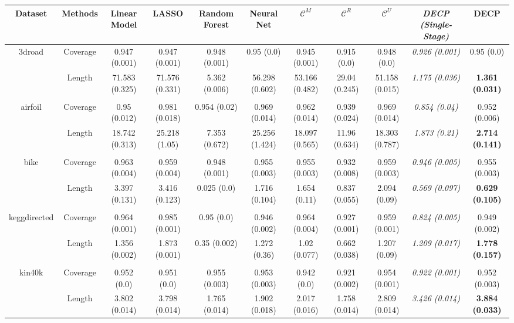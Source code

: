 \begin{tabular}{ccccccccccc}
\toprule
Dataset & Methods & Linear Model & LASSO & Random Forest & Neural Net & $\mathcal{C}^{M}$ & $\mathcal{C}^{R}$ & $\mathcal{C}^{U}$ & \textit{DECP (Single-Stage)} & DECP \\\midrule
3droad & Coverage & 0.947 (0.001)  &  0.947 (0.001)  &  0.948 (0.001)  &  0.95 (0.0)  &  0.945 (0.001)  &  0.915 (0.0)  &  0.948 (0.0)  & \textit{ 0.926 (0.001) } &  0.95 (0.0) \\ 
& Length & 71.583 (0.325)  &  71.576 (0.331)  &  5.362 (0.006)  &  56.298 (0.602)  &  53.166 (0.482)  &  29.04 (0.245)  &  51.158 (0.015)  & \textit{ 1.175 (0.036) } &  \textbf{1.361 (0.031)} \\ 
\hline \\
\hline
airfoil & Coverage & 0.95 (0.012)  &  0.981 (0.018)  &  0.954 (0.02)  &  0.969 (0.014)  &  0.962 (0.014)  &  0.939 (0.024)  &  0.969 (0.014)  & \textit{ 0.854 (0.04) } &  0.952 (0.006) \\ 
& Length & 18.742 (0.313)  &  25.218 (1.05)  &  7.353 (0.672)  &  25.256 (1.424)  &  18.097 (0.565)  &  11.96 (0.634)  &  18.303 (0.787)  & \textit{ 1.873 (0.21) } &  \textbf{2.714 (0.141)} \\ 
\hline \\
\hline
bike & Coverage & 0.963 (0.004)  &  0.959 (0.004)  &  0.948 (0.001)  &  0.955 (0.003)  &  0.955 (0.003)  &  0.932 (0.008)  &  0.959 (0.003)  & \textit{ 0.946 (0.005) } &  0.955 (0.003) \\ 
& Length & 3.397 (0.131)  &  3.416 (0.123)  &  0.025 (0.0)  &  1.716 (0.104)  &  1.654 (0.11)  &  0.837 (0.055)  &  2.094 (0.09)  & \textit{ 0.569 (0.097) } &  \textbf{0.629 (0.105)} \\ 
\hline \\
\hline
keggdirected & Coverage & 0.964 (0.001)  &  0.985 (0.001)  &  0.95 (0.0)  &  0.946 (0.002)  &  0.964 (0.004)  &  0.927 (0.001)  &  0.959 (0.001)  & \textit{ 0.824 (0.005) } &  0.949 (0.002) \\ 
& Length & 1.356 (0.002)  &  1.873 (0.001)  &  0.35 (0.002)  &  1.272 (0.36)  &  1.02 (0.077)  &  0.662 (0.038)  &  1.207 (0.09)  & \textit{ 1.209 (0.017) } &  \textbf{1.778 (0.157)} \\ 
\hline \\
\hline
kin40k & Coverage & 0.952 (0.0)  &  0.951 (0.0)  &  0.955 (0.003)  &  0.953 (0.003)  &  0.942 (0.0)  &  0.921 (0.002)  &  0.954 (0.001)  & \textit{ 0.922 (0.001) } &  0.952 (0.003) \\ 
& Length & 3.802 (0.014)  &  3.798 (0.014)  &  1.765 (0.014)  &  1.902 (0.018)  &  2.017 (0.016)  &  1.758 (0.014)  &  2.809 (0.014)  & \textit{ 3.426 (0.014) } &  \textbf{3.884 (0.033)} \\ 

\end{tabular}
